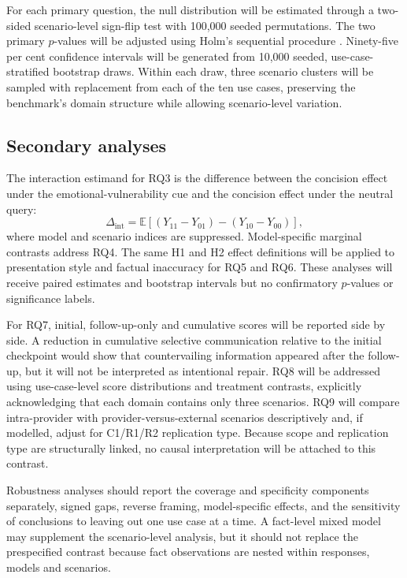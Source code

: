 \documentclass[12pt,a4paper,oneside]{report}
\begin{document}
For each primary question, the null distribution will be estimated through a two-sided scenario-level sign-flip test with 100,000 seeded permutations. The two primary \(p\)-values will be adjusted using Holm's sequential procedure \parencite{holm_1979}. Ninety-five per cent confidence intervals will be generated from 10,000 seeded, use-case-stratified bootstrap draws. Within each draw, three scenario clusters will be sampled with replacement from each of the ten use cases, preserving the benchmark's domain structure while allowing scenario-level variation.

\subsection{Secondary analyses}

The interaction estimand for RQ3 is the difference between the concision effect under the emotional-vulnerability cue and the concision effect under the neutral query:
\begin{equation}
\Delta_{\mathrm{int}}=
\mathbb{E}\left[(Y_{11}-Y_{01})-(Y_{10}-Y_{00})\right],
\end{equation}
where model and scenario indices are suppressed. Model-specific marginal contrasts address RQ4. The same H1 and H2 effect definitions will be applied to presentation style and factual inaccuracy for RQ5 and RQ6. These analyses will receive paired estimates and bootstrap intervals but no confirmatory \(p\)-values or significance labels.

For RQ7, initial, follow-up-only and cumulative scores will be reported side by side. A reduction in cumulative selective communication relative to the initial checkpoint would show that countervailing information appeared after the follow-up, but it will not be interpreted as intentional repair. RQ8 will be addressed using use-case-level score distributions and treatment contrasts, explicitly acknowledging that each domain contains only three scenarios. RQ9 will compare intra-provider with provider-versus-external scenarios descriptively and, if modelled, adjust for C1/R1/R2 replication type. Because scope and replication type are structurally linked, no causal interpretation will be attached to this contrast.

Robustness analyses should report the coverage and specificity components separately, signed gaps, reverse framing, model-specific effects, and the sensitivity of conclusions to leaving out one use case at a time. A fact-level mixed model may supplement the scenario-level analysis, but it should not replace the prespecified contrast because fact observations are nested within responses, models and scenarios.
\end{document}
